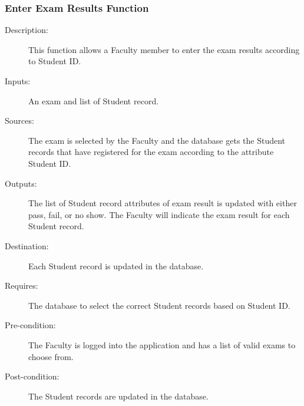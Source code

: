 \subsubsection{\large Enter Exam Results Function} 
\begin{boxed} %
\small\begin{description}
\item[Description:]
   This function allows a Faculty member to enter the exam results
   according to Student ID.
\item[Inputs:]
   An exam and list of Student record.
\item[Sources:]
   The exam is selected by the Faculty and the database gets the Student
   records that have registered for the exam according to the attribute
   Student ID.
\item[Outputs:]
   The list of Student record attributes of exam result is updated with
   either pass, fail, or no show. The Faculty will indicate the exam result for each
   Student record.
\item[Destination:]
   Each Student record is updated in the database.
\item[Requires:]
   The database to select the correct Student records based on Student ID.
\item[Pre-condition:]
   The Faculty is logged into the application and has a list of valid exams 
   to choose from.
\item[Post-condition:]
   The Student records are updated in the database.
\end{description}
\normalsize
\end{boxed} %

